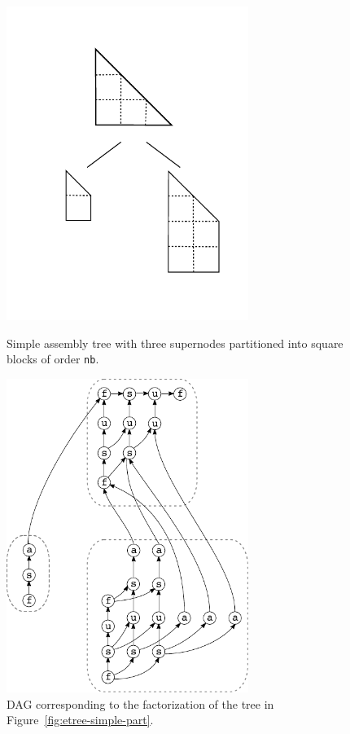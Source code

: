 \documentclass{article}
\begin{document}
\begin{figure}[!h]
  \begin{minipage}{0.5\textwidth}
    \centering
    \includegraphics[width=0.7\textwidth]{figures/etree_simple_part}
    \caption{\label{fig:etree-simple-part}Simple assembly tree with
      three supernodes partitioned into square blocks of order
      \texttt{nb}.}
  \end{minipage}
  \hspace{0.5cm}
  \begin{minipage}{0.5\textwidth}
    \centering
    \includegraphics[width=0.7\textwidth]{figures/dag}
    \caption{\label{fig:dag-simple} DAG corresponding to the
      factorization of the tree in Figure~\ref{fig:etree-simple-part}.}
  \end{minipage}
\end{figure}
\end{document}
